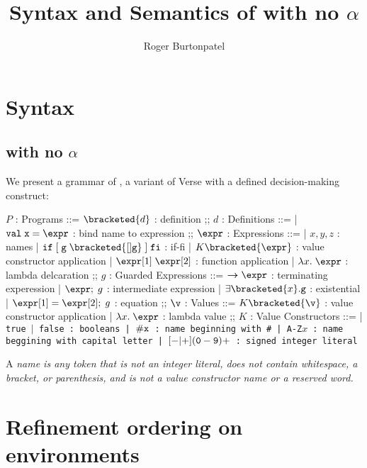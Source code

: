 \documentclass[]{article}
\title{Syntax and Semantics of \VMinus with no $\alpha$}
\author{Roger Burtonpatel}
\begin{document}
\maketitle

\section{Syntax}

\subsection{\VMinus with no $\alpha$}

We present a grammar of \VMinus, a variant of Verse with a defined
decision-making construct: 

\bigskip


\begin{center}
    \begin{bnf}
    $P$ : \textsf{Programs} ::=
    $\bracketed{d}$ : definition
    ;;
    $d$ : \textsf{Definitions} ::=
    | $\tt{val} \; x \; \tt{=} \; \expr$ : bind name to expression
    ;;
    $\expr$ : \textsf{Expressions} ::=
    | $x, y, z$ : names
    | $\tt{if} \; \tt{[}\; g \; \bracketed{[] g} \;\tt{]} \; \tt{fi}$ : if-fi 
    | $K \bracketed{\expr}$ : value constructor application 
    | $\expr[1] \; \expr[2]$ : function application 
    | $\lambda x. \; \expr$ : lambda delcaration 
    ;;
    $g$ : \textsf{Guarded Expressions} ::=  
    $\boldsymbol{\rightarrow}\expr$ : terminating experession
    | $\expr; \; g$ : intermediate expression 
    | $\exists \bracketed{x} \tt{.} g$ : existential 
    | $\expr[1] = \expr[2]; \; g$ : equation 
    ;;
    $\v$ : Values ::= $K\bracketed{\v}$ : value constructor application 
    | $\lambda x. \; \expr$ : lambda value
    ;;
    $K$ : \textsf{Value Constructors} ::=
    | \tt{true} $\vert$ \tt{false} : booleans
    | $\tt{\#}x$ : name beginning with \tt{\#}
    | \tt{A-Z}$x$ : name beggining with capital letter
    | $[\tt{-}\vert\tt{+}](\tt{0}-\tt{9})+$ : signed integer literal 
    \end{bnf}
\end{center}

A \it{name} is any token that is not an integer literal, 
does not contain whitespace, a bracket, or parenthesis, 
and is not a value constructor name or a reserved word.
        
\section{Refinement ordering on environments}
\end{document}
